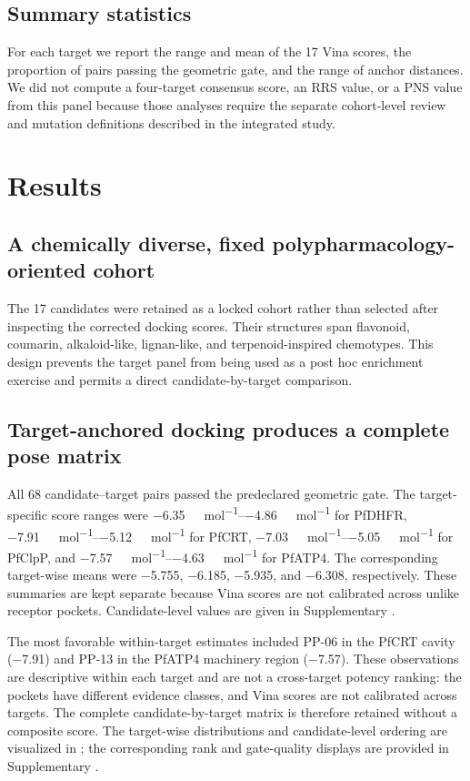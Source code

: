 \documentclass[journal=jcisd8,manuscript=article]{achemso}
\begin{document}
\subsection{Summary statistics}
For each target we report the range and mean of the 17 Vina scores, the proportion of pairs passing the geometric gate, and the range of anchor distances. We did not compute a four-target consensus score, an RRS value, or a PNS value from this panel because those analyses require the separate cohort-level review and mutation definitions described in the integrated study.

\section{Results}
\subsection{A chemically diverse, fixed polypharmacology-oriented cohort}
The 17 candidates were retained as a locked cohort rather than selected after inspecting the corrected docking scores. Their structures span flavonoid, coumarin, alkaloid-like, lignan-like, and terpenoid-inspired chemotypes. This design prevents the target panel from being used as a post hoc enrichment exercise and permits a direct candidate-by-target comparison.

\subsection{Target-anchored docking produces a complete pose matrix}
All \num{68} candidate--target pairs passed the predeclared geometric gate. The target-specific score ranges were \qtyrange{-6.35}{-4.86}{\kilo\calorie\per\mole} for PfDHFR, \qtyrange{-7.91}{-5.12}{\kilo\calorie\per\mole} for PfCRT, \qtyrange{-7.03}{-5.05}{\kilo\calorie\per\mole} for PfClpP, and \qtyrange{-7.57}{-4.63}{\kilo\calorie\per\mole} for PfATP4. The corresponding target-wise means were \num{-5.755}, \num{-6.185}, \num{-5.935}, and \num{-6.308}, respectively. These summaries are kept separate because Vina scores are not calibrated across unlike receptor pockets. Candidate-level values are given in Supplementary .

The most favorable within-target estimates included PP-06 in the PfCRT cavity (\num{-7.91}) and PP-13 in the PfATP4 machinery region (\num{-7.57}). These observations are descriptive within each target and are not a cross-target potency ranking: the pockets have different evidence classes, and Vina scores are not calibrated across targets. The complete candidate-by-target matrix is therefore retained without a composite score. The target-wise distributions and candidate-level ordering are visualized in ; the corresponding rank and gate-quality displays are provided in Supplementary .
\end{document}
